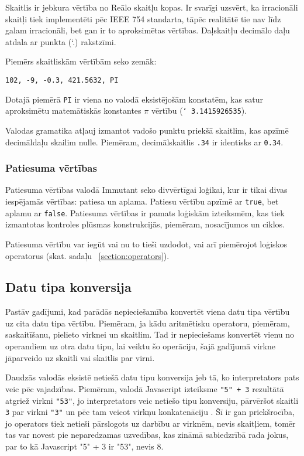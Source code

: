 \documentclass[12pt,a4paper]{report}
\begin{document}
Skaitlis ir jebkura vērtība no Reālo skaitļu kopas. Ir svarīgi uzsvērt, ka irracionāli skaitļi tiek implementēti pēc IEEE 754 standarta, tāpēc realitātē tie nav līdz galam irracionāli, bet gan ir to aproksimētas vērtības. Daļskaitļu decimālo daļu atdala ar punkta (\char`.) rakstzīmi.

Piemērs skaitliskām vērtībām seko zemāk:

\begin{verbatim}
102, -9, -0.3, 421.5632, PI
\end{verbatim}

Dotajā piemērā \texttt{PI} ir viena no valodā eksistējošām konstatēm, kas satur aproksimētu matemātiskās konstantes $\pi$ vērtību (\texttt{\char`~3.1415926535}).

Valodas gramatika atļauj izmantot vadošo punktu priekšā skaitlim, kas apzīmē decimāldaļu skailim nulle. Piemēram, decimālskaitlis \texttt{.34} ir identisks ar \texttt{0.34}.


\subsubsection{Patiesuma vērtības}

Patiesuma vērtības valodā Immutant seko divvērtīgai loģikai, kur ir tikai divas iespējamās vērtības: patiesa un aplama. Patiesu vērtību apzīmē ar \texttt{true}, bet aplamu ar \texttt{false}. Patiesuma vērtības ir pamats loģiskām izteiksmēm, kas tiek izmantotas kontroles plūsmas konstrukcijās, piemēram, nosacījumos un ciklos. 

Patiesuma vērtību var iegūt vai nu to tieši uzdodot, vai arī piemērojot loģiskos operatorus (skat. sadaļu ~\ref{section:operators}).

\subsection{Datu tipa konversija}

Pastāv gadījumi, kad parādās nepieciešamība konvertēt viena datu tipa vērtību uz cita datu tipa vērtību. Piemēram, ja kādu aritmētisku operatoru, piemēram, saskaitīšanu, pielieto virknei un skaitlim. Tad ir nepieciešams konvertēt vienu no operandiem uz otra datu tipu, lai veiktu šo operāciju, šajā gadījumā virkne jāparveido uz skaitli vai skaitlis par virni. 

Daudzās valodās eksistē netiešā datu tipu konversija jeb tā, ko interpretators pats veic pēc vajadzības. Piemēram, valodā Javascript izteiksme \texttt{"5" + 3} rezultātā atgriež virkni \texttt{"53"}, jo interpretators veic netiešo tipu konversiju, pārvēršot skaitli \texttt{3} par virkni \texttt{"3"} un pēc tam veicot virkņu konkatenāciju \cite{ecma-262}. Šī ir gan priekšrocība, jo operators tiek netieši pārslogots uz darbību ar virknēm, nevis skaitļiem, tomēr tas var novest pie neparedzamas uzvedības, kas zināmā sabiedzrībā rada jokus, par to kā Javascript "5" + 3 ir "53", nevis 8.
\end{document}
